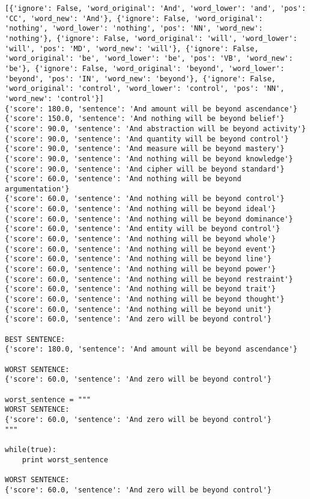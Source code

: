 \documentclass[12pt,a4paper,oneside]{book}
\begin{document}
\begin{verbatim}
[{'ignore': False, 'word_original': 'And', 'word_lower': 'and', 'pos': 'CC', 'word_new': 'And'}, {'ignore': False, 'word_original': 'nothing', 'word_lower': 'nothing', 'pos': 'NN', 'word_new': 'nothing'}, {'ignore': False, 'word_original': 'will', 'word_lower': 'will', 'pos': 'MD', 'word_new': 'will'}, {'ignore': False, 'word_original': 'be', 'word_lower': 'be', 'pos': 'VB', 'word_new': 'be'}, {'ignore': False, 'word_original': 'beyond', 'word_lower': 'beyond', 'pos': 'IN', 'word_new': 'beyond'}, {'ignore': False, 'word_original': 'control', 'word_lower': 'control', 'pos': 'NN', 'word_new': 'control'}]
{'score': 180.0, 'sentence': 'And amount will be beyond ascendance'}
{'score': 150.0, 'sentence': 'And nothing will be beyond belief'}
{'score': 90.0, 'sentence': 'And abstraction will be beyond activity'}
{'score': 90.0, 'sentence': 'And quantity will be beyond control'}
{'score': 90.0, 'sentence': 'And measure will be beyond mastery'}
{'score': 90.0, 'sentence': 'And nothing will be beyond knowledge'}
{'score': 90.0, 'sentence': 'And cipher will be beyond standard'}
{'score': 60.0, 'sentence': 'And nothing will be beyond argumentation'}
{'score': 60.0, 'sentence': 'And nothing will be beyond control'}
{'score': 60.0, 'sentence': 'And nothing will be beyond ideal'}
{'score': 60.0, 'sentence': 'And nothing will be beyond dominance'}
{'score': 60.0, 'sentence': 'And entity will be beyond control'}
{'score': 60.0, 'sentence': 'And nothing will be beyond whole'}
{'score': 60.0, 'sentence': 'And nothing will be beyond event'}
{'score': 60.0, 'sentence': 'And nothing will be beyond line'}
{'score': 60.0, 'sentence': 'And nothing will be beyond power'}
{'score': 60.0, 'sentence': 'And nothing will be beyond restraint'}
{'score': 60.0, 'sentence': 'And nothing will be beyond trait'}
{'score': 60.0, 'sentence': 'And nothing will be beyond thought'}
{'score': 60.0, 'sentence': 'And nothing will be beyond unit'}
{'score': 60.0, 'sentence': 'And zero will be beyond control'}

BEST SENTENCE:
{'score': 180.0, 'sentence': 'And amount will be beyond ascendance'}

WORST SENTENCE:
{'score': 60.0, 'sentence': 'And zero will be beyond control'}

worst_sentence = """
WORST SENTENCE:
{'score': 60.0, 'sentence': 'And zero will be beyond control'}
"""

while(true):
	print worst_sentence
	 
WORST SENTENCE:
{'score': 60.0, 'sentence': 'And zero will be beyond control'}


\end{verbatim}
\end{document}
